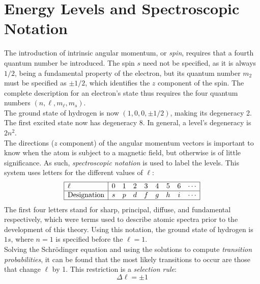 \documentclass{subfiles}
\begin{document}
	\section{Energy Levels and Spectroscopic Notation}
		The introduction of intrinsic angular momentum, or \textit{spin}, requires that a fourth quantum number be introduced. The spin \(s\) need not be specified, as it is always \(1/2\), being a fundamental property of the electron, but its quantum number \(m_2\) must be specified as \(\pm 1/2\), which identifies the \(z\) component of the spin. The complete description for an electron's state thus requires the four quantum numbers \((n, \ell, m_\ell, m_s)\). \\
		The ground state of hydrogen is now \((1, 0, 0, \pm 1/2)\), making its degeneracy 2. The first excited state now has degeneracy 8. In general, a level's degeneracy is \(2n^2\). \\
		The directions (\(z\) component) of the angular momentum vectors is important to know when the atom is subject to a magnetic field, but otherwise is of little significance. As such, \textit{spectroscopic notation} is used to label the levels. This system uses letters for the different values of \(\ell\):
		\[\begin{array}{|l|cccccccc|}\hline
			\ell & 0 & 1 & 2 & 3 & 4 & 5 & 6 & \cdots \\\hline
			\text{Designation} & s & p & d & f & g & h & i & \cdots \\\hline
		\end{array}\]
		The first four letters stand for sharp, principal, diffuse, and fundamental respectively, which were terms used to describe atomic spectra prior to the development of this theory. Using this notation, the ground state of hydrogen is \(1s\), where \(n = 1\) is specified before the \(\ell = 1\). \\
		Solving the Schr\"odinger equation and using the solutions to compute \textit{transition probabilities}, it can be found that the most likely transitions to occur are those that change \(\ell\) by 1. This restriction is a \textit{selection rule}:
			\[
				\Delta \ell = \pm 1
					\tag{selection rule}
			\]
\end{document}
